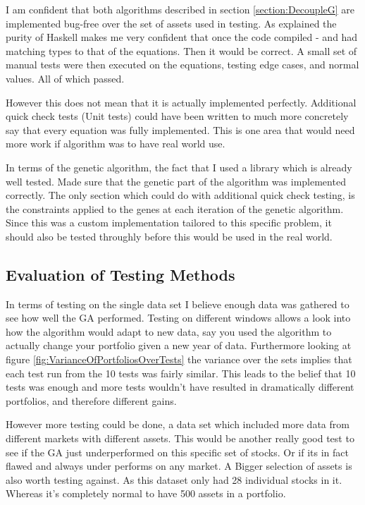 \documentclass[11pt]{article}
\begin{document}
    I am confident that both algorithms described in section \ref{section:DecoupleG}
    are implemented bug-free over the set of assets used in testing. As explained
    the purity of Haskell makes me very confident that once the code compiled - and
    had matching types to that of the equations. Then it would be correct. A small
    set of manual tests were then executed on the equations, testing edge cases,
    and normal values. All of which passed.

    However this does not mean that it is actually implemented perfectly. Additional
    quick check tests \cite{QuickCheck} (Unit tests) could have been written to
    much more concretely say that every equation was fully implemented. This is
    one area that would need more work if algorithm was to have real world use.

    In terms of the genetic algorithm, the fact that I used a library \cite{Moo}
    which is already well tested. Made sure that the genetic part of the algorithm
    was implemented correctly. The only section which could do with additional
    quick check testing, is the constraints applied to the genes at each iteration
    of the genetic algorithm. Since this was a custom implementation tailored to
    this specific problem, it should also be tested throughly before this
    would be used in the real world.

\subsection{Evaluation of Testing Methods}

    In terms of testing on the single data set \cite{Dataset} I believe enough
    data was gathered to see how well the GA performed. Testing on different
    windows allows a look into how the algorithm would adapt to new data,
    say you used the algorithm to actually change your portfolio given a
    new year of data. Furthermore looking at figure \ref{fig:VarianceOfPortfoliosOverTests}
    the variance over the sets implies that each test run from the 10 tests was
    fairly similar. This leads to the belief that 10 tests was enough and more tests
    wouldn't have resulted in dramatically different portfolios, and therefore
    different gains.

    However more testing could be done, a data set which included more data from
    different markets with different assets. This would be another really good test
    to see if the GA just underperformed on this specific set of stocks. Or if its
    in fact flawed and always under performs on any market. A Bigger selection
    of assets is also worth testing against. As this dataset only had 28 individual
    stocks in it. Whereas it's completely normal to have 500 assets in a portfolio.
\end{document}
